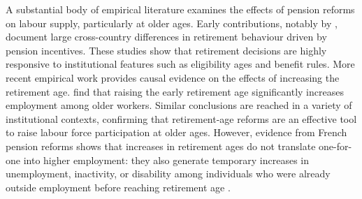 \documentclass[11pt,english,a4paper, twoside, authoryear]{article}
\begin{document}
A substantial body of empirical literature examines the effects of pension reforms on labour supply, particularly at older ages. Early contributions, notably by \citet{GruberWise1999}, document large cross-country differences in retirement behaviour driven by pension incentives. These studies show that retirement decisions are highly responsive to institutional features such as eligibility ages and benefit rules. More recent empirical work provides causal evidence on the effects of increasing the retirement age. \citet{StaubliZweimuller2013} find that raising the early retirement age significantly increases employment among older workers. Similar conclusions are reached in a variety of institutional contexts, confirming that retirement-age reforms are an effective tool to raise labour force participation at older ages. However, evidence from French pension reforms shows that increases in retirement ages do not translate one-for-one into higher employment: they also generate temporary increases in unemployment, inactivity, or disability among individuals who were already outside employment before reaching retirement age \citep{Rabate2020, Dubois2016, Leduigou2016}.

\end{document}
